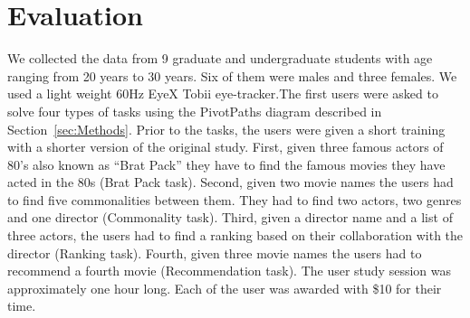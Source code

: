 \section{Evaluation}
\label{sec:Evaluation}
We collected the data from 9 graduate and undergraduate students with age ranging from 20 years to 30 years. Six of them were males and three females. We used a light weight 60Hz EyeX Tobii eye-tracker.The first users were asked to solve four types of tasks using the PivotPaths diagram described in Section~\ref{sec:Methods}. Prior to the tasks, the users were given a short training with a shorter version of the original study. First, given three famous actors of 80's also known as ``Brat Pack'' they have to find the famous movies they have acted in the 80s (Brat Pack task). Second, given two movie names the users had to find five commonalities between them. They had to find two actors, two genres and one director (Commonality task). Third, given a director name and a list of three actors, the users had to find a ranking based on their collaboration with the director (Ranking task). Fourth, given three movie names the users had to recommend a fourth movie (Recommendation task). The user study session was approximately one hour long. Each of the user was awarded with \$10 for their time. 

